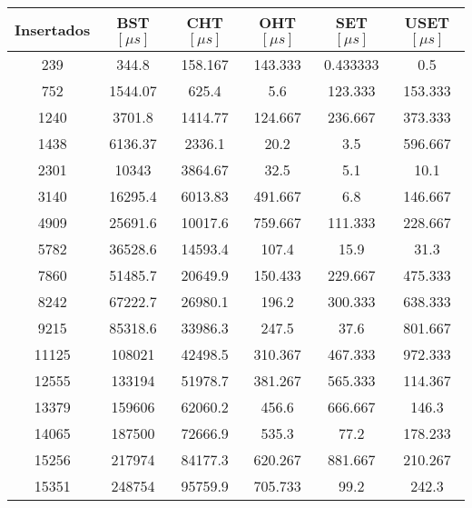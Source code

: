 \begin{table}[H]
\centering
\begin{tabular}{cccccc}\hline
\textbf{Insertados} & \textbf{BST $[\mu s]$} & \textbf{CHT $[\mu s]$} & \textbf{OHT $[\mu s]$} & \textbf{SET $[\mu s]$} & \textbf{USET $[\mu s]$} \\ \hline
239                 & 344.8        & 158.167      & 143.333      & 0.433333     & 0.5           \\
752                 & 1544.07      & 625.4        & 5.6          & 123.333      & 153.333       \\
1240                & 3701.8       & 1414.77      & 124.667      & 236.667      & 373.333       \\
1438                & 6136.37      & 2336.1       & 20.2         & 3.5          & 596.667       \\
2301                & 10343        & 3864.67      & 32.5         & 5.1          & 10.1          \\
3140                & 16295.4      & 6013.83      & 491.667      & 6.8          & 146.667       \\
4909                & 25691.6      & 10017.6      & 759.667      & 111.333      & 228.667       \\
5782                & 36528.6      & 14593.4      & 107.4        & 15.9         & 31.3          \\
7860                & 51485.7      & 20649.9      & 150.433      & 229.667      & 475.333       \\
8242                & 67222.7      & 26980.1      & 196.2        & 300.333      & 638.333       \\
9215                & 85318.6      & 33986.3      & 247.5        & 37.6         & 801.667       \\
11125               & 108021       & 42498.5      & 310.367      & 467.333      & 972.333       \\
12555               & 133194       & 51978.7      & 381.267      & 565.333      & 114.367       \\
13379               & 159606       & 62060.2      & 456.6        & 666.667      & 146.3         \\
14065               & 187500       & 72666.9      & 535.3        & 77.2         & 178.233       \\
15256               & 217974       & 84177.3      & 620.267      & 881.667      & 210.267       \\
15351               & 248754       & 95759.9      & 705.733      & 99.2         & 242.3         \\

\end{tabular}
\end{table}
